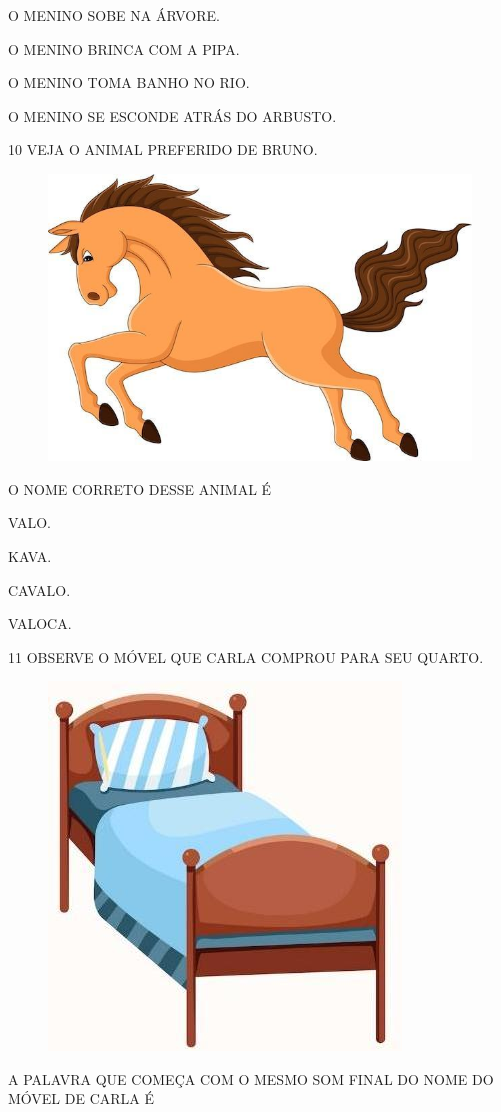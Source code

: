 \begin{escolha}
\item O MENINO SOBE NA ÁRVORE.

\item O MENINO BRINCA COM A PIPA.

\item O MENINO TOMA BANHO NO RIO.

\item O MENINO SE ESCONDE ATRÁS DO ARBUSTO.
\end{escolha}

\num{10} VEJA O ANIMAL PREFERIDO DE BRUNO.

\begin{figure}[H]
\centering
\includegraphics[width=.4\textwidth]{media/image234.jpg}
\end{figure}


O NOME CORRETO DESSE ANIMAL É

\begin{multicols}{2}
\begin{escolha}
\item VALO.

\item KAVA.

\item CAVALO.

\item VALOCA.
\end{escolha}
\end{multicols}

\num{11} OBSERVE O MÓVEL QUE CARLA COMPROU PARA SEU QUARTO.

\begin{figure}[H]
\centering
\includegraphics[width=.2\textwidth]{media/image235.jpg}
\end{figure}

A PALAVRA QUE COMEÇA COM O MESMO SOM FINAL DO NOME DO MÓVEL DE CARLA É 


